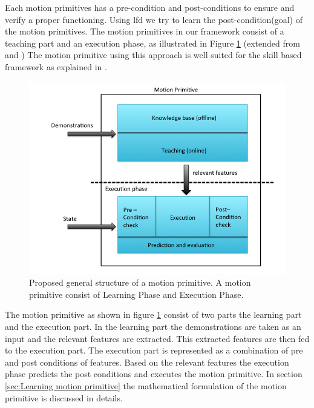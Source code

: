 Each motion primitives has a pre-condition and post-conditions to ensure and verify a proper
functioning. Using \acrshort{lfd} we try to learn the post-condition(goal) of the motion primitives. The
motion primitives in our framework consist of a teaching part and an execution phase, as
illustrated in Figure \ref{motion primitive} (extended from \cite{bogh_does_2012} and \cite{andersen_using_2014})
The motion primitive using this approach is well suited for the skill
based framework as explained in \cite{pedersen_robot_2015}. 
\begin{figure}[htp] \centering
    \includegraphics[scale=0.5]{images/motion_primitive_color.png}
    \caption[General structure of a motion primitive]{Proposed general
    structure of a motion primitive. A motion primitive consist of Learning
Phase and Execution Phase.} \label{motion primitive} \end{figure}

The motion primitive as shown in figure \ref{motion primitive} consist of two parts 
the learning part and the execution part.
In the learning part the demonstrations are taken as an input and the relevant features are 
extracted. This extracted features are then fed to the execution part.
The execution part is represented as a combination of pre and post conditions of features.
Based on the relevant features the execution phase predicts the post conditions 
and executes  the motion primitive.
In section \ref{sec:Learning motion primitive} the mathematical formulation of the 
motion primitive is discussed in details.

